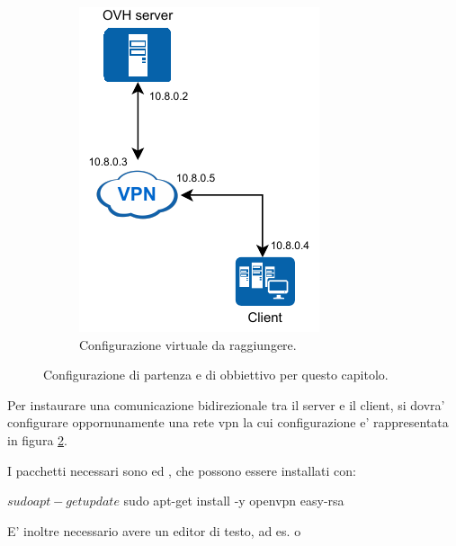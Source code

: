 \begin{figure}[h]
\begin{subfigure}{0.5\textwidth}
        \includegraphics[height=1.2\linewidth]{immagini/diag-simple_ips_vpn}
        \caption{Configurazione virtuale da raggiungere.}
        \label{fig:diag-simple_ips_vpn}
    \end{subfigure}%
    \caption{Configurazione di partenza e di obbiettivo per questo capitolo. \cite{icons}}
\end{figure}

Per instaurare una comunicazione bidirezionale tra il server e il client, si dovra' configurare oppornunamente una rete vpn la cui configurazione e' rappresentata in figura \ref{fig:diag-simple_ips_vpn}.


I pacchetti necessari sono  ed , che possono essere installati con:

\begin{bashcode}
$ sudo apt-get update
$ sudo apt-get install -y openvpn easy-rsa
\end{bashcode}

E' inoltre necessario avere un editor di testo, ad es.  o 


